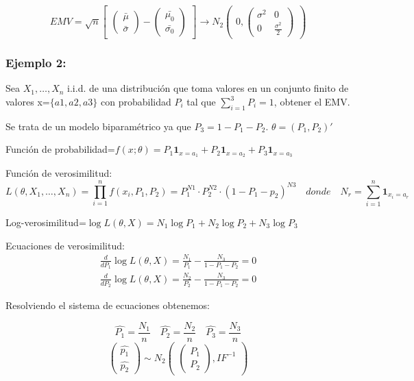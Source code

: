 \[ EMV=\sqrt{n}
\begin{bmatrix}
    \begin{pmatrix}
        \bar{\mu}\\
        \bar{\sigma}
    \end{pmatrix}
    -
    \begin{pmatrix}
        \bar{\mu_0}\\
        \bar{\sigma_0}
    \end{pmatrix}
\end{bmatrix}
\to
N_2
\begin{pmatrix}
    0,
    \begin{pmatrix}
        \sigma^2 & 0\\
        0 & \frac{\sigma^2}{2}
    \end{pmatrix}
        
    \end{pmatrix}
\]

\subsubsection*{Ejemplo 2:}
Sea $X_1,\dots,X_n$ i.i.d. de una distribución que toma valores en un conjunto finito de valores x=$\{a1,a2,a3\}$ con probabilidad
$P_i$ tal que $\sum_{i=1}^{3} P_i=1$, obtener el EMV.

Se trata de un modelo biparamétrico ya que $P_3=1-P_1-P_2$. $\theta=(P_1,P_2)'$

Función de probabilidad=$f(x; \theta) = P_1 \mathbf{1}_{x = a_1} + P_2 \mathbf{1}_{x = a_2} + P_3 \mathbf{1}_{x = a_3}$

Función de verosimilitud:
\[L(\theta,X_1,\dots,X_n)=\prod_{i=1}^{n}f(x_i,P_1,P_2)=P_1^{N1}\cdot P_2^{N2} \cdot (1-P_1-p_2)^{N3}
\quad donde \quad N_r=\sum_{i=1}^{n} \mathbf{1}_{x_i=a_r}
\]

Log-verosimilitud=$ \log L(\theta,X)=N_1 \log P_1 + N_2 \log P_2 +N_3 \log P_3$

Ecuaciones de verosimilitud:
\[
\begin{matrix}
    \frac{d}{dP_1} \log L(\theta,X)=\frac{N_1}{P_1}-\frac{N_3}{1-P_1-P_2}=0
    \\ \frac{d}{dP_2} \log L(\theta,X)=\frac{N_2}{P_2}-\frac{N_3}{1-P_1-P_2}=0
    
\end{matrix}
\]

Resolviendo el sistema de ecuaciones obtenemos:

\[
\hat{P_1}=\frac{N_1}{n} \quad \hat{P_2}=\frac{N_2}{n} \quad \hat{P_3}=\frac{N_3}{n}
\]
\[
\begin{pmatrix}
    \hat{p_1} \\
    \hat{p_2}
\end{pmatrix}
\sim
N_2
\begin{pmatrix}
    \begin{pmatrix}
        P_1 \\
        P_2
    \end{pmatrix}
, IF^{-1}
\end{pmatrix}
\]

